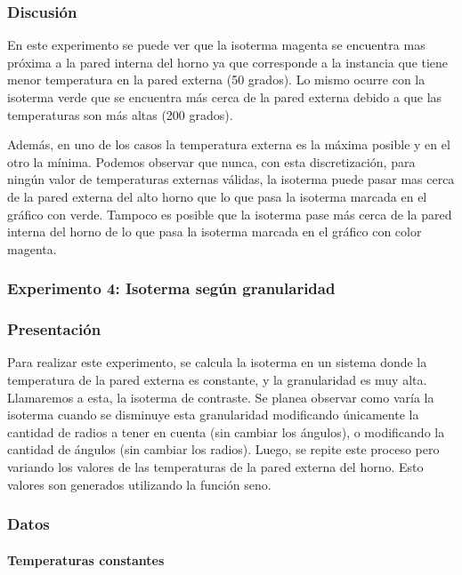       \subsubsection*{Discusión}
        En este experimento se puede ver que la isoterma magenta se encuentra mas próxima a la pared interna del horno ya que corresponde a la instancia que tiene menor temperatura en la pared externa (50 grados). Lo mismo ocurre con la isoterma verde que se encuentra más cerca de la pared externa debido a que las temperaturas son más altas (200 grados).

        Además, en uno de los casos la temperatura externa es la máxima posible y en el otro la mínima. Podemos observar que nunca, con esta discretización, para ningún valor de temperaturas externas válidas, la isoterma puede pasar mas cerca de la pared externa del alto horno que lo que pasa la isoterma marcada en el gráfico con verde. Tampoco es posible que la isoterma pase más cerca de la pared interna del horno de lo que pasa la isoterma marcada en el gráfico con color magenta.


    \subsubsection*{Experimento 4: Isoterma según granularidad} 
      
      \subsubsection*{Presentación}
        Para realizar este experimento, se calcula la isoterma en un sistema donde la temperatura de la pared externa es constante, y la granularidad es muy alta. Llamaremos a esta, la isoterma de contraste. Se planea observar como varía la isoterma cuando se disminuye esta granularidad modificando únicamente la cantidad de radios a tener en cuenta (sin cambiar los ángulos), o modificando la cantidad de ángulos (sin cambiar los radios).
        Luego, se repite este proceso pero variando los valores de las temperaturas de la pared externa del horno. Esto valores son generados utilizando la función seno.

      \subsubsection*{Datos}

      \paragraph{Temperaturas constantes}

